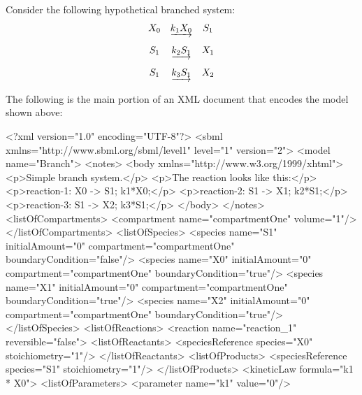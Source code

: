 \documentclass[10pt]{cekarticle}
\newcommand{\changed}[1]{\textcolor{BrickRed}{#1}}
\begin{document}
Consider the following hypothetical branched system:
\begin{equation*}
  \begin{array}{@{}ccc@{}}
    X_0 & \underrightarrow{k_1 X_0} & S_1 \\ \\[-4pt]
    S_1 & \underrightarrow{k_2 S_1} & X_1 \\ \\[-4pt]
    S_1 & \underrightarrow{k_3 S_1} & X_2
  \end{array}
\end{equation*}

The following is the main portion of an XML document that encodes the model
shown above:

\newpage

\begin{example}
<?xml version="1.0" encoding="UTF-8"?>
<sbml xmlns="http://www.sbml.org/sbml/level1"
      level="1" version="\changed{2}">
    <model name="Branch">
        <notes>
            <body xmlns="http://www.w3.org/1999/xhtml">
                <p>Simple branch system.</p>
                <p>The reaction looks like this:</p>
                <p>reaction-1:   X0 -> S1; k1*X0;</p>
                <p>reaction-2:   S1 -> X1; k2*S1;</p>
                <p>reaction-3:   S1 -> X2; k3*S1;</p>
            </body>
        </notes>
        <listOfCompartments>
            <compartment name="compartmentOne" volume="1"/>
        </listOfCompartments>
        <listOfSpecies>
            <\changed{species} name="S1" initialAmount="0" compartment="compartmentOne"
                     boundaryCondition="false"/>
            <\changed{species} name="X0" initialAmount="0" compartment="compartmentOne"
                     boundaryCondition="true"/>
            <\changed{species} name="X1" initialAmount="0" compartment="compartmentOne"
                     boundaryCondition="true"/>
            <\changed{species} name="X2" initialAmount="0" compartment="compartmentOne"
                     boundaryCondition="true"/>
        </listOfSpecies>
        <listOfReactions>
            <reaction name="reaction_1" reversible="false">
                <listOfReactants>
                    <\changed{speciesReference} \changed{species=}"X0" stoichiometry="1"/>
                </listOfReactants>
                <listOfProducts>
                    <\changed{speciesReference} \changed{species=}"S1" stoichiometry="1"/>
                </listOfProducts>
                <kineticLaw formula="k1 * X0">
                    <listOfParameters>
                        <parameter name="k1" value="0"/>

\end{example}
\end{document}
